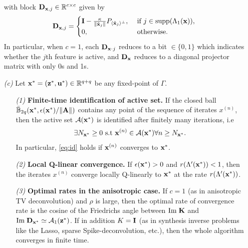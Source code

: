 \begin{theorem}
\begin{itemize}
with block $\mathbf{D}_{\mathbf{x},j} \in \mathbb{R}^{c \times c}$
given by
\begin{eqnarray}
\mathbf{D}_{\mathbf{x},j} = \begin{cases}\mathbf{I} -
  \frac{\kappa}{\|\tilde{\mathbf{x}}_j\|}P_{\langle
        \tilde{\mathbf{x}}_j \rangle^\perp}, &\mbox{ if } j \in
  \operatorname{supp}(\Lambda_1(\mathbf{x})),\\ 0, &\mbox{ otherwise.}\end{cases}
\label{eq:d}
\end{eqnarray}
In particular,  when $c=1$,  each $\mathbf{D}_{\mathbf{x}^,j}$ reduces to a
bit $\in \{0,1\}$ which indicates whether the $j$th feature is
active, and $\mathbf{D}_{\mathbf{x}}$ reduces to a diagonal projector matrix with only
0s and 1s.

\item[\textit{(c)}] Let $\mathbf{x}^* = (\mathbf{z}^*, \mathbf{u}^*)\in \mathbb{R}^{q+q}$ be any fixed-point of $\Gamma$.
\begin{itemize}
\item[\textit{(1)}] \textbf{Finite-time identification of
    active set.} If the closed ball $\bar{\mathbb{B}}_{2q}(\mathbf{x}^*, \epsilon(\mathbf{x}^*)/\|\mathbf{A}\|)$
    contains any point of the sequence of iterates $x^{(n)}$, then the
    active set $\mathcal{A}(\mathbf{x}^*)$ is
    identified after finitely many iterations, i.e
    \begin{eqnarray}
      \label{eq:id}
      \exists N_{\mathbf{x}^*} \ge 0 \text{ s.t }\mathbf{x}^{(n)} \in \mathcal{A}(\mathbf{x}^*)
      \forall n \ge N_{\mathbf{x}^*}.
    \end{eqnarray}
      In particular, \eqref{eq:id} holds if $\mathbf{x}^{(n)}$ converges to $\mathbf{x}^*$.

\item[\textit{(2)}] \textbf{Local Q-linear convergence.}
If $\epsilon(\mathbf{x}^*) > 0$ and $r(\Lambda'(\mathbf{x}^*)) < 1$, then the iterates
$x^{(n)}$ converge locally Q-linearly to $\mathbf{x}^*$
at the rate $r(\Lambda'(\mathbf{x}^*))$.

\label{thm:frechet}
\item[\textit{(3)}] \textbf{Optimal rates in the anisotropic case.}
If $c=1$ (as in anisotropic TV deconvolution) and $\rho$ is large, then the optimal rate of convergence
rate is the cosine of the Friedrichs angle between
$\mathrm{Im}\;\mathbf{K}$ and $\mathrm{Im}\;\mathbf{D}_{\mathbf{x}^*} \simeq \mathcal A_1(\mathbf{z}^*)$. If in addition
$K = \mathbf{I}$ (as in synthesis inverse problems like the Lasso, sparse  Spike-deconvolution, etc.), then
the whole algorithm converges in finite time.
\end{itemize}
\end{itemize}
\end{theorem}

